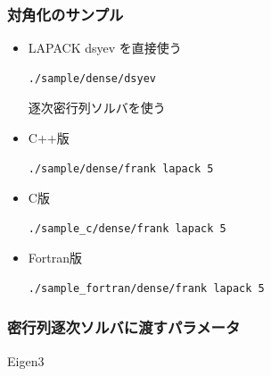 \begin{frame}[c,fragile]
  \frametitle{対角化のサンプル}
  \begin{itemize}
  \item LAPACK dsyev を直接使う 
\begin{lstlisting}[style=shstyle]
./sample/dense/dsyev
\end{lstlisting}
逐次密行列ソルバを使う
  \item C++版 
\begin{lstlisting}[style=shstyle]
./sample/dense/frank lapack 5
\end{lstlisting}
  \item C版 
\begin{lstlisting}[style=shstyle]
./sample_c/dense/frank lapack 5
\end{lstlisting}
  \item Fortran版 
\begin{lstlisting}[style=shstyle]
./sample_fortran/dense/frank lapack 5
\end{lstlisting}
  \end{itemize}
\end{frame}

\begin{frame}[c,fragile]
  \frametitle{密行列逐次ソルバに渡すパラメータ}
Eigen3\\
\end{frame}

